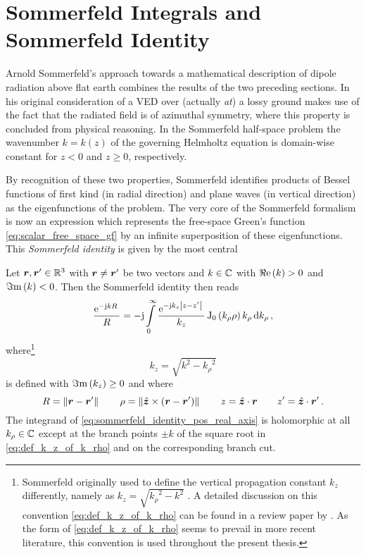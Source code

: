 \section{Sommerfeld Integrals and Sommerfeld Identity}
\label{sec:sommerfeld_integrals_and_identity}

Arnold Sommerfeld's approach towards a mathematical description of dipole
radiation above flat earth combines the results of the two preceding
sections.
In his original consideration of a \ac{VED} over (actually \emph{at}) a lossy
ground \textcite{Sommerfeld1909} makes use of the fact that the radiated field
is of azimuthal symmetry, where this property is concluded from physical
reasoning.
In the Sommerfeld half-space problem the wavenumber $k = k\left(z\right)$ of
the governing Helmholtz equation is domain-wise constant for $z < 0$ and
$z \geq 0$, respectively.

By recognition of these two properties, Sommerfeld identifies products of
Bessel functions of first kind (in radial direction) and plane waves
(in vertical direction) as the eigenfunctions of the problem.
The very core of the Sommerfeld formalism is now an expression which represents
the free-space Green's function \eqref{eq:scalar_free_space_gf} by an infinite
superposition of these eigenfunctions.
This \emph{Sommerfeld identity} is given by the most central
\cite[eq.~(10)]{Sommerfeld1909}\cite[66]{Chew1999}
\begin{theorem}\label{thm:sommerfeld_identity}
	Let $\robs, \rsrc \in \R^3$ with $\robs \neq \rsrc$ be two vectors and
	$k \in \mathbb{C}$ with $\Re\mathrm{e}\left(k\right) > 0$ and $\Im\mathrm{m}\left(k\right) < 0$.
	Then the Sommerfeld identity then reads
	\begin{equation}\label{eq:sommerfeld_identity_pos_real_axis}
		\frac{\mathrm{e}^{-\mathrm{j} k R}\,}{R} = 
		-\mathrm{j}
		\int\limits_{0}^{\infty} 
		\frac{\mathrm{e}^{-\mathrm{j} k_z \left\vert z - z^\prime\right\vert}\,}{k_z}
		\operatorname{J}_{0} \left(k_\rho \rho\right)
		k_\rho 
		\,
		\mathrm{d} k_\rho
		\, ,
	\end{equation}
	where\footnote{
		Sommerfeld originally used to define the vertical propagation constant
		$k_z$ differently, namely as $k_z = \sqrt{{k_\rho}^2 - k^2}$
		\cite{Sommerfeld1909,Sommerfeld1964}.
		A detailed discussion on this convention \vs \eqref{eq:def_k_z_of_k_rho}
		can be found in a review paper by \textcite{Mosig2021}.
		As the form of \eqref{eq:def_k_z_of_k_rho} seems to prevail in
		more recent literature, this convention is used throughout the present
		thesis.
		}
	\begin{equation}\label{eq:def_k_z_of_k_rho}
		k_z = \sqrt{k^2 - {k_\rho}^2}
	\end{equation}
	is defined with $\Im\mathrm{m}\left(k_z\right) \geq 0$ and where
	\begin{equation}
		\rdiffNormSymbol = \rdiffNorm \qquad
		\rho = \norm{\uv{z} \times \left(\rdiff\right)} \qquad
		z = \uv{z} \cdot \robs \qquad
		z^\prime = \uv{z} \cdot \rsrc
		\, .
	\end{equation}
	The integrand of \eqref{eq:sommerfeld_identity_pos_real_axis} is holomorphic
	at all $k_\rho \in \mathbb{C}$ except at the branch points $\pm k$ of the square 
	root in \eqref{eq:def_k_z_of_k_rho} and on the corresponding branch cut.
\end{theorem}

